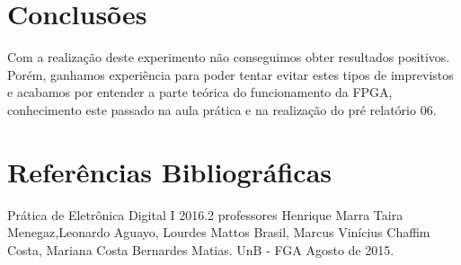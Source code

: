 \documentclass[12pts]{article}
\begin{document}
\section{Conclusões}

Com a realização deste experimento não conseguimos obter resultados positivos. Porém, ganhamos experiência para poder tentar evitar estes tipos de imprevistos e acabamos por entender a parte teórica do funcionamento da FPGA, conhecimento este passado na aula prática e na realização do pré relatório 06. 

\section{Referências Bibliográficas}

Prática de Eletrônica Digital I 2016.2 professores Henrique Marra Taira Menegaz,Leonardo Aguayo, Lourdes Mattos Brasil, Marcus Vinícius Chaffim Costa, Mariana Costa Bernardes Matias. UnB - FGA Agosto de 2015.

\newpage
\end{document}
